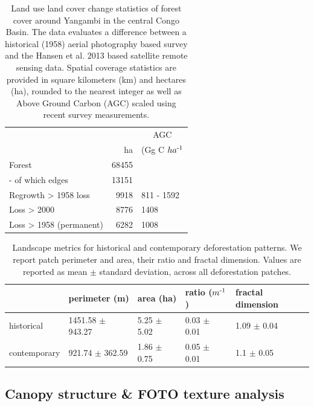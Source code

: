 \documentclass[remote sensing,article,submit,moreauthors,pdftex]{mdpi}
\begin{document}
\begin{table}[!h]

\caption{\label{tab:unnamed-chunk-10}Land use land cover change statistics of forest cover around Yangambi in the central Congo Basin. The data evaluates a difference between a historical (1958) aerial photography based survey and the Hansen et al. 2013 based satellite remote sensing data. Spatial coverage statistics are provided in square kilometers (km) and hectares (ha), rounded to the nearest integer as well as Above Ground Carbon (AGC) scaled using recent survey measurements.}
\centering
\begin{tabular}[t]{lrl}
\toprule
\multicolumn{2}{c}{ } & \multicolumn{1}{c}{AGC} \\
\cmidrule(l{3pt}r{3pt}){3-3}
  & ha & (Gg C $ha\textsuperscript{-1}$\\
\midrule
Forest & 68455 & \\
-  of which edges & 13151 & \\
Regrowth > 1958 loss & 9918 & 811 - 1592\\
Loss > 2000 & 8776 & 1408\\
Loss > 1958 (permanent) & 6282 & 1008\\
\bottomrule
\end{tabular}
\end{table}

\begin{table}[!h]

\caption{\label{tab:unnamed-chunk-11}Landscape metrics for historical and contemporary deforestation patterns. We report patch perimeter and area, their ratio and fractal dimension. Values are reported as mean $\pm$ standard deviation, across all deforestation patches.}
\centering
\begin{tabular}[t]{lllll}
\toprule
  & perimeter (m) & area (ha) & ratio ($m\textsuperscript{-1}$) & fractal dimension\\
\midrule
historical & 1451.58 $\pm$ 943.27 & 5.25 $\pm$ 5.02 & 0.03 $\pm$ 0.01 & 1.09 $\pm$ 0.04\\
contemporary & 921.74 $\pm$ 362.59 & 1.86 $\pm$ 0.75 & 0.05 $\pm$ 0.01 & 1.1 $\pm$ 0.05\\
\bottomrule
\end{tabular}
\end{table}

\hypertarget{canopy-structure-foto-texture-analysis-1}{%
\subsection{Canopy structure \& FOTO texture
analysis}\label{canopy-structure-foto-texture-analysis-1}}
\end{document}
